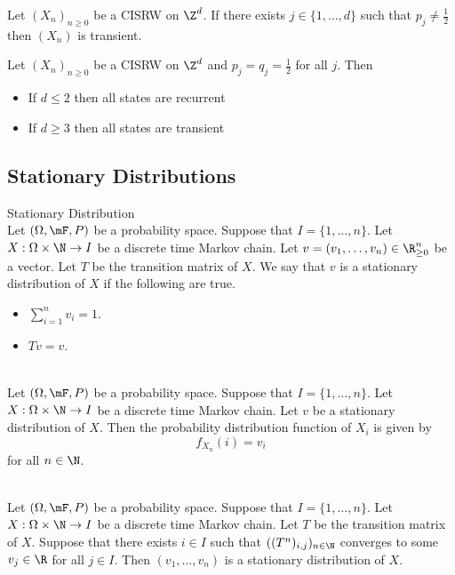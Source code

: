 \documentclass[a4paper]{article}
\begin{document}
\begin{prp}{}{} Let $(X_n)_{n\geq 0}$ be a CISRW on $\Z^d$. If there exists $j\in\{1,\dots,d\}$ such that $p_j\neq\frac{1}{2}$ then $(X_n)$ is transient. 
\end{prp}

\begin{prp}{}{} Let $(X_n)_{n\geq 0}$ be a CISRW on $\Z^d$ and $p_j=q_j=\frac{1}{2}$ for all $j$. Then
\begin{itemize}
\item If $d\leq 2$ then all states are recurrent
\item If $d\geq 3$ then all states are transient
\end{itemize}
\end{prp}

\subsection{Stationary Distributions}
\begin{defn}{Stationary Distribution}{}\\
Let $(\Omega,\mF,P)$ be a probability space. Suppose that $I=\{1,\dots,n\}$. Let $X:\Omega\times\N\to I$ be a discrete time Markov chain. Let $v=(v_1,\dots,v_n)\in\R_{\geq 0}^n$ be a vector. Let $T$ be the transition matrix of $X$. We say that $v$ is a stationary distribution of $X$ if the following are true. 
\begin{itemize}
\item $\sum_{i=1}^nv_i=1$. 
\item $Tv=v$. 
\end{itemize}
\end{defn}

\begin{lmm}{}{}\\
Let $(\Omega,\mF,P)$ be a probability space. Suppose that $I=\{1,\dots,n\}$. Let $X:\Omega\times\N\to I$ be a discrete time Markov chain. Let $v$ be a stationary distribution of $X$. Then the probability distribution function of $X_i$ is given by $$f_{X_n}(i)=v_i$$ for all $n\in\N$. 
\end{lmm}

\begin{prp}{}{}\\
Let $(\Omega,\mF,P)$ be a probability space. Suppose that $I=\{1,\dots,n\}$. Let $X:\Omega\times\N\to I$ be a discrete time Markov chain. Let $T$ be the transition matrix of $X$. Suppose that there exists $i\in I$ such that $((T^n)_{i,j})_{n\in\N}$ converges to some $v_j\in\R$ for all $j\in I$. Then $(v_1,\dots,v_n)$ is a stationary distribution of $X$. 
\end{prp}
\end{document}
